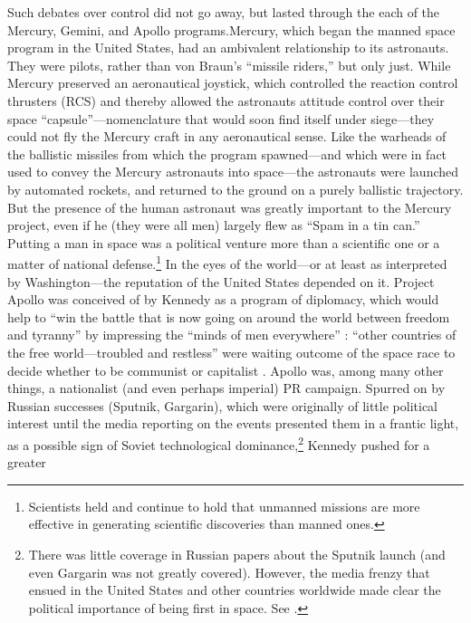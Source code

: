 
Such debates over control did not go away, but lasted through the each
of the Mercury, Gemini, and Apollo programs.Mercury, which began the
manned space program in the United States, had an ambivalent
relationship to its astronauts. They were pilots, rather than von
Braun's ``missile riders,'' but only just. While Mercury preserved an
aeronautical joystick, which controlled the reaction control thrusters
(RCS) and thereby allowed the astronauts attitude control over their
space ``capsule''---nomenclature that would soon find itself under
siege\cite[p. 85]{kauffman}---they could not fly the Mercury craft in any
aeronautical sense. Like the warheads of the ballistic missiles from
which the program spawned---and which were in fact used to convey the
Mercury astronauts into space---the astronauts were launched by
automated rockets, and returned to the ground on a purely ballistic
trajectory. But the presence of the human astronaut was greatly
important to the Mercury project, even if he (they were all men)
largely flew as ``Spam in a tin can.''\cite[p. 60]{wolfe} Putting a man in
space was a political venture more than a scientific one or a matter
of national defense.\footnote{Scientists held and continue to hold
  that unmanned missions are more effective in generating scientific
  discoveries than manned ones.} In the eyes of the world---or at
least as interpreted by Washington---the
reputation of the United States depended on it. Project Apollo was
conceived of by Kennedy as a program of diplomacy,
which would help to ``win the battle that is now going on around the
world between freedom and tyranny'' by impressing the ``minds of men
everywhere'' \cite{KennedyMay25}: ``other countries of the free
world---troubled and restless'' were waiting outcome of the space race to
decide whether to be communist or capitalist \cite{KennedySep7}. Apollo was, among many
other things, a nationalist (and even perhaps imperial) PR campaign.
Spurred on by Russian successes (Sputnik, Gargarin), which were
originally of little political interest until the media reporting on
the events presented them in a frantic light, as a possible sign of
Soviet technological dominance,\footnote{There was little coverage in
  Russian papers about the Sputnik launch (and even Gargarin was not
  greatly covered). However, the media frenzy that ensued in the United
States and other countries worldwide made clear the political
importance of being first in space. See \cite{bessonov}.} Kennedy pushed for a greater
